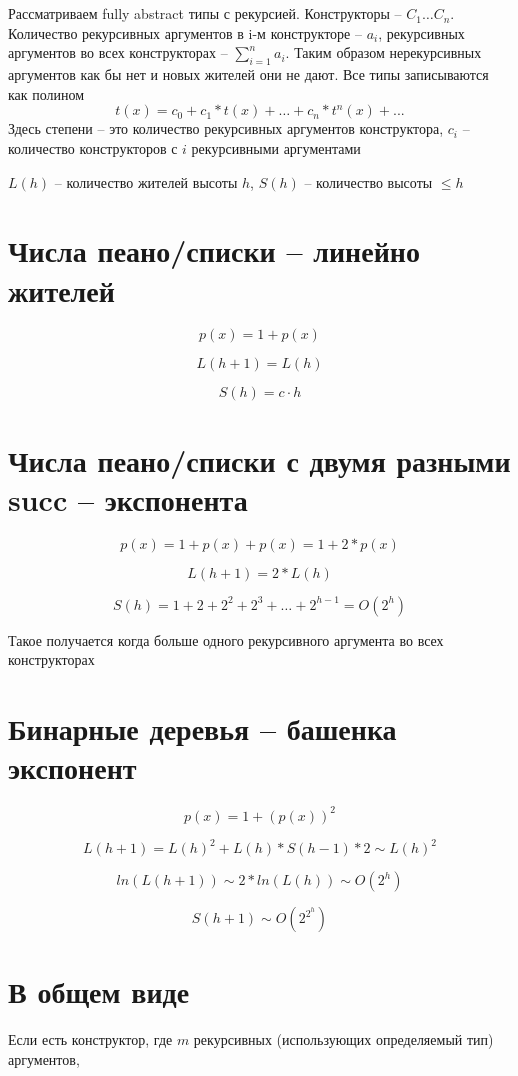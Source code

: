 \documentclass{article}
\begin{document}
\section{}
Рассматриваем fully abstract типы с рекурсией. Конструкторы -- $C_1\dots C_n$. Количество рекурсивных аргументов в i-м конструкторе -- $a_i$, рекурсивных аргументов во всех конструкторах -- $\sum_{i=1}^{n} a_i$. Таким образом нерекурсивных аргументов как бы нет и новых жителей они не дают. Все типы записываются как полином
\[
t(x) = c_0 + c_1*t(x) + \dots + c_n*t^n(x) + ...
\]
Здесь степени -- это количество рекурсивных аргументов конструктора, $c_i$ -- количество конструкторов с $i$ рекурсивными аргументами

$L(h)$ -- количество жителей высоты $h$, $S(h)$ -- количество высоты $\leq h$ 

\section{Числа пеано/списки -- линейно жителей}
$$ p(x) = 1 + p(x) $$

$$ L(h+1) = L(h) $$
  
$$ S(h) = c\cdot h $$

\section{Числа пеано/списки с двумя разными succ -- экспонента}
$$ p(x) = 1 + p(x) +  p(x) = 1 + 2*p(x)$$

$$ L(h+1) = 2*L(h) $$
  
$$ S(h) = 1 + 2 + 2^2 +2^3 +\dots +2^{h-1} = O(2^h) $$

Такое получается когда больше одного рекурсивного аргумента во всех конструкторах

\section{Бинарные деревья -- башенка экспонент}
$$ p(x) = 1 + (p(x))^2$$

$$ L(h+1) = L(h)^2 +  L(h)*S(h-1)*2 \sim L(h)^2$$

$$ ln (L(h+1)) \sim 2 * ln(L(h)) \sim O(2^h)$$
  
$$S(h+1)\sim O(2^{2^h}) $$

\section{В общем виде}
Если есть конструктор, где $m$ рекурсивных (использующих определяемый тип) аргументов, 
\end{document}
